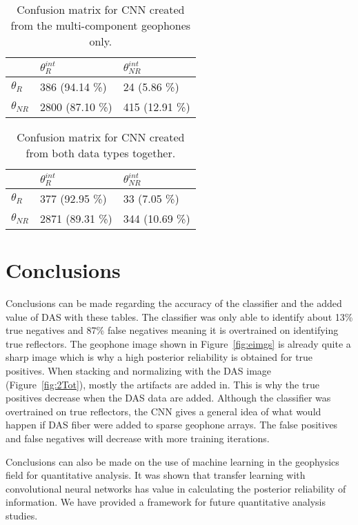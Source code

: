 \begin{table}[]
\centering
\caption{Confusion matrix for CNN created from the multi-component geophones only.}
\label{table:CNNResults-SSource}
\setlength{\tabcolsep}{1em}
\begin{tabular}{|l|l|l|}
  \hline
& $\theta_R^{int}$ & $\theta_{NR}^{int}$  \\
\hline
$\theta_R$  & 386 (94.14 \%) & 24 (5.86 \%) \\
\hline
$\theta_{NR}$ & 2800 (87.10 \%) & 415 (12.91 \%)  \\
\hline
\end{tabular}
\end{table}

\begin{table}[]
\centering
\caption{Confusion matrix for CNN created from both data types together.}
\label{table:CNNResults-SSourceBoth}
\setlength{\tabcolsep}{1em}
\begin{tabular}{|l|l|l|}
  \hline
& $\theta_R^{int}$ & $\theta_{NR}^{int}$  \\
\hline
$\theta_R$  & 377 (92.95 \%) & 33 (7.05 \%) \\
\hline
$\theta_{NR}$ & 2871 (89.31 \%) & 344  (10.69 \%)\\
\hline
\end{tabular}
\end{table}

\section{Conclusions}
Conclusions can be made regarding the accuracy of the classifier and the added value of DAS with these tables. The classifier was only able to identify about 13\% true negatives and 87\% false negatives meaning it is overtrained on identifying true reflectors. The geophone image shown in Figure~\ref{fig:eimgs} is already quite a sharp image which is why a high posterior reliability is obtained for true positives. When stacking and normalizing with the DAS image (Figure~\ref{fig:2Tot}), mostly the artifacts are added in. This is why the true positives decrease when the DAS data are added. Although the classifier was overtrained on true reflectors, the CNN gives a general idea of what would happen if DAS fiber were added to sparse geophone arrays. The false positives and false negatives will decrease with more training iterations.

Conclusions can also be made on the use of machine learning in the geophysics field for quantitative analysis. It was shown that transfer learning with convolutional neural networks has value in calculating the posterior reliability of information. We have provided a framework for future quantitative analysis studies.
